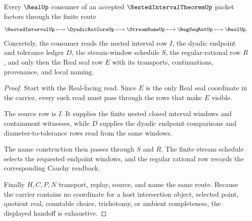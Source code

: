 \begin{theorem}
\label{thm:nested-interval-theorem-real-seal-handoff}
Every $\RealUp$ consumer of an accepted $\NestedIntervalTheoremUp$ packet factors through the finite route
$$
\NestedIntervalUp \longmapsto \DyadicRatCoreUp \longmapsto \StreamNameUp \longmapsto \RegSeqRatUp \longmapsto \RealUp .
$$
Concretely, the consumer reads the nested interval row $I$, the dyadic endpoint and tolerance ledger $D$, the stream-window schedule $S$, the regular-rational row $R$, and only then the Real seal row $E$ with its transports, continuations, provenance, and local naming.
\end{theorem}
\begin{proof}
Start with the Real-facing read. Since $E$ is the only Real seal coordinate in the carrier, every such read must pass through the rows that make $E$ visible.

The source row is $I$. It supplies the finite nested closed interval windows and containment witnesses, while $D$ supplies the dyadic endpoint comparisons and diameter-to-tolerance rows read from the same windows.

The name construction then passes through $S$ and $R$. The finite stream schedule selects the requested endpoint windows, and the regular rational row records the corresponding Cauchy readback.

Finally $H,C,P,N$ transport, replay, source, and name the same route. Because the carrier contains no coordinate for a host intersection object, selected point, quotient real, countable choice, trichotomy, or ambient completeness, the displayed handoff is exhaustive.
\end{proof}


\begin{closurestatus}{\NestedIntervalTheoremUp}
  \theoryclosure{\seedClosure}
  \formalstatus{\unformalizedV}
\end{closurestatus}
